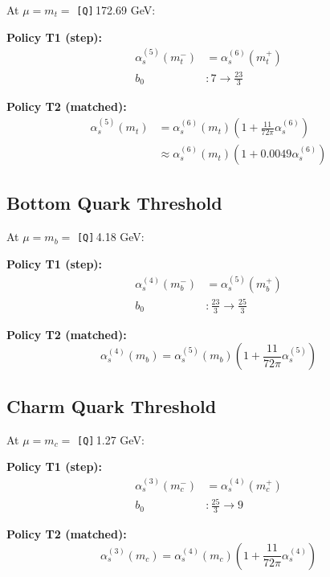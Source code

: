 \documentclass[11pt,a4paper]{article}
\newcommand{\Qnum}[1]{\textcolor{red!70!black}{\texttt{[Q]}}\,#1}
\theoremstyle{definition}
\begin{document}
At $\mu = m_t = $ \Qnum{172.69} GeV:

\textbf{Policy T1 (step):}
\begin{align}
\label{eq:top-t1-1}
\alpha_s^{(5)}(m_t^-) &= \alpha_s^{(6)}(m_t^+) \\
\label{eq:top-t1-2}
b_0 &: 7 \to \frac{23}{3}
\end{align}

\textbf{Policy T2 (matched):}
\begin{align}
\label{eq:top-t2-1}
\alpha_s^{(5)}(m_t) &= \alpha_s^{(6)}(m_t)\left(1 + \frac{11}{72\pi}\alpha_s^{(6)}\right) \\
\label{eq:top-t2-2}
&\approx \alpha_s^{(6)}(m_t)(1 + 0.0049\alpha_s^{(6)})
\end{align}

\subsection{Bottom Quark Threshold}
\label{subsec:bottom-threshold-app}

At $\mu = m_b = $ \Qnum{4.18} GeV:

\textbf{Policy T1 (step):}
\begin{align}
\label{eq:bottom-t1-1}
\alpha_s^{(4)}(m_b^-) &= \alpha_s^{(5)}(m_b^+) \\
\label{eq:bottom-t1-2}
b_0 &: \frac{23}{3} \to \frac{25}{3}
\end{align}

\textbf{Policy T2 (matched):}
\begin{equation}
\label{eq:bottom-t2}
\alpha_s^{(4)}(m_b) = \alpha_s^{(5)}(m_b)\left(1 + \frac{11}{72\pi}\alpha_s^{(5)}\right)
\end{equation}

\subsection{Charm Quark Threshold}
\label{subsec:charm-threshold-app}

At $\mu = m_c = $ \Qnum{1.27} GeV:

\textbf{Policy T1 (step):}
\begin{align}
\label{eq:charm-t1-1}
\alpha_s^{(3)}(m_c^-) &= \alpha_s^{(4)}(m_c^+) \\
\label{eq:charm-t1-2}
b_0 &: \frac{25}{3} \to 9
\end{align}

\textbf{Policy T2 (matched):}
\begin{equation}
\label{eq:charm-t2}
\alpha_s^{(3)}(m_c) = \alpha_s^{(4)}(m_c)\left(1 + \frac{11}{72\pi}\alpha_s^{(4)}\right)
\end{equation}
\end{document}
